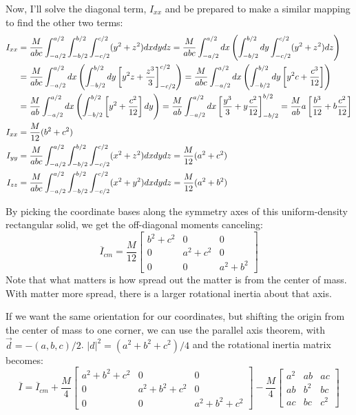 \documentclass[10pt]{article}
\begin{document}
Now, I'll solve the diagonal term, $I_{xx}$ and be prepared to make a similar 
mapping to find the other two terms:
\begin{align}
    I_{xx} &= \frac{M}{abc}\int_{-a/2}^{a/2}\int_{-b/2}^{b/2}
        \int_{-c/2}^{c/2} (y^2+z^2) dxdydz
        = \frac{M}{abc}\int_{-a/2}^{a/2}dx
        \left(\int_{-b/2}^{b/2}dy 
        \int_{-c/2}^{c/2}(y^2+z^2) dz \right) \notag\\
    &=\frac{M}{abc}\int_{-a/2}^{a/2}dx
        \left(\int_{-b/2}^{b/2}dy 
        \left[y^2z + \frac{z^3}{3}\right]_{-c/2}^{c/2} \right)
        =\frac{M}{abc}\int_{-a/2}^{a/2}dx
        \left(\int_{-b/2}^{b/2}dy 
        \left[y^2c + \frac{c^3}{12}\right] \right) \notag\\
    &=\frac{M}{ab}\int_{-a/2}^{a/2}dx
        \left(\int_{-b/2}^{b/2}
        \left[y^2 + \frac{c^2}{12}\right]dy \right)
        =\frac{M}{ab}\int_{-a/2}^{a/2}dx 
        \left[\frac{y^3}{3} + y\frac{c^2}{12}\right]_{-b/2}^{b/2}
        =\frac{M}{ab}a\left[\frac{b^3}{12} + b\frac{c^2}{12}\right] \notag\\
    I_{xx}&=\frac{M}{12}(b^2 + c^2) \\
    I_{yy} &= \frac{M}{abc}\int_{-a/2}^{a/2}\int_{-b/2}^{b/2}
        \int_{-c/2}^{c/2} (x^2+z^2) dxdydz = \frac{M}{12}(a^2 + c^2) \\
    I_{zz} &= \frac{M}{abc}\int_{-a/2}^{a/2}\int_{-b/2}^{b/2}
        \int_{-c/2}^{c/2} (x^2+y^2) dxdydz = \frac{M}{12}(a^2 + b^2)
\end{align}

By picking the coordinate bases along the symmetry axes of this 
uniform-density rectangular solid, we get the off-diagonal moments canceling:
\[
\overline{I}_{cm} = \frac{M}{12}
\begin{bmatrix}
    b^2 + c^2 & 0 & 0 \\
    0 & a^2 + c^2 & 0 \\
    0 & 0 & a^2 + b^2
\end{bmatrix}
\]
Note that what matters is how spread out the matter is from the center of 
mass. With matter more spread, there is a larger rotational inertia about that 
axis.

If we want the same orientation for our coordinates, but shifting the origin
from the center of mass to one corner, we can use the parallel axis theorem, 
with $\vec{d} = -(a,b,c)/2$. $|d|^2 = (a^2 + b^2 + c^2)/4$ and the 
rotational inertia matrix becomes:
\[
\overline{I} = \overline{I}_{cm} + \frac{M}{4}
\begin{bmatrix}
    a^2 + b^2 + c^2 & 0 & 0 \\
    0 & a^2 + b^2 + c^2 & 0 \\
    0 & 0 & a^2 + b^2 + c^2
\end{bmatrix}
-\frac{M}{4}
\begin{bmatrix}
    a^2 & ab & ac \\
    ab & b^2 & bc \\
    ac & bc & c^2
\end{bmatrix}
\]
\end{document}
